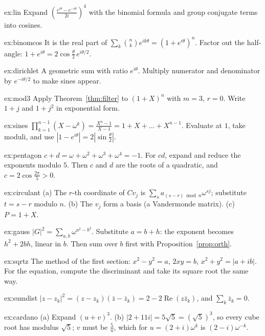 \begin{hint}{ex:lin}
Expand $\left(\frac{e^{i\theta}-e^{-i\theta}}{2i}\right)^4$ with the binomial formula and group conjugate terms into cosines.
\end{hint}
\begin{hint}{ex:binomcos}
It is the real part of $\sum_k\binom nke^{ik\theta}=(1+e^{i\theta})^n$. Factor out the half-angle: $1+e^{i\theta}=2\cos\frac\theta2\,e^{i\theta/2}$.
\end{hint}
\begin{hint}{ex:dirichlet}
A geometric sum with ratio $e^{i\theta}$. Multiply numerator and denominator by $e^{-i\theta/2}$ to make sines appear.
\end{hint}
\begin{hint}{ex:mod3}
Apply Theorem~\ref{thm:filter} to $(1+X)^n$ with $m=3$, $r=0$. Write $1+j$ and $1+j^2$ in exponential form.
\end{hint}
\begin{hint}{ex:sines}
$\prod_{k=1}^{n-1}(X-\omega^k)=\frac{X^n-1}{X-1}=1+X+\dots+X^{n-1}$. Evaluate at $1$, take moduli, and use $|1-e^{i\theta}|=2\left|\sin\frac\theta2\right|$.
\end{hint}
\begin{hint}{ex:pentagon}
$c+d=\omega+\omega^2+\omega^3+\omega^4=-1$. For $cd$, expand and reduce the exponents modulo $5$. Then $c$ and $d$ are the roots of a quadratic, and $c=2\cos\frac{2\pi}5>0$.
\end{hint}
\begin{hint}{ex:circulant}
(a) The $r$-th coordinate of $Cv_j$ is $\sum_sa_{(s-r)\bmod n}\omega^{sj}$; substitute $t=s-r$ modulo $n$. (b) The $v_j$ form a basis (a Vandermonde matrix). (c) $P=1+X$.
\end{hint}
\begin{hint}{ex:gauss}
$|G|^2=\sum_{a,b}\omega^{a^2-b^2}$. Substitute $a=b+h$: the exponent becomes $h^2+2bh$, linear in $b$. Then sum over $b$ first with Proposition~\ref{prop:orth}.
\end{hint}
\begin{hint}{ex:sqrtz}
The method of the first section: $x^2-y^2=a$, $2xy=b$, $x^2+y^2=|a+ib|$. For the equation, compute the discriminant and take its square root the same way.
\end{hint}
\begin{hint}{ex:sumdist}
$|z-z_k|^2=(z-z_k)(\bar z-\bar z_k)=2-2\operatorname{Re}(z\bar z_k)$, and $\sum_k\bar z_k=0$.
\end{hint}
\begin{hint}{ex:cardano}
(a) Expand $(u+v)^3$. (b) $|2+11i|=5\sqrt5=(\sqrt5)^3$, so every cube root has modulus $\sqrt5$; $v$ must be $\frac5u$, which for $u=(2+i)\omega^k$ is $(2-i)\omega^{-k}$.
\end{hint}
